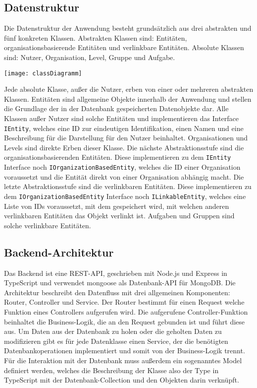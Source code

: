 \subsection{Datenstruktur}
Die Datenstruktur der Anwendung besteht grundsätzlich aus drei abstrakten und fünf konkreten Klassen. Abstrakten Klassen sind: Entitäten, organisationsbasierende Entitäten und verlinkbare Entitäten. Absolute Klassen sind: Nutzer, Organisation, Level, Gruppe und Aufgabe.

\vspace{20pt}
\begin{center}
    \begin{minipage}{0.8\linewidth}
        \texttt{[image: classDiagramm]}
    \end{minipage}
\end{center}
\vspace{20pt}

Jede absolute Klasse, außer die Nutzer, erben von einer oder mehreren abstrakten Klassen. Entitäten sind allgemeine Objekte innerhalb der Anwendung und stellen die Grundlage der in der Datenbank gespeicherten Datenobjekte dar. Alle Klassen außer Nutzer sind solche Entitäten und implementieren das Interface \verb|IEntity|, welches eine ID zur eindeutigen Identifikation, einen Namen und eine Beschreibung für die Darstellung für den Nutzer beinhaltet. Organisationen und Levels sind direkte Erben dieser Klasse. Die nächste Abstraktionsstufe sind die organisationsbasierenden Entitäten. Diese implementieren zu dem \verb|IEntity| Interface noch \verb|IOrganizationBasedEntity|, welches die ID einer Organisation voraussetzt und die Entität direkt von einer Organisation abhängig macht. Die letzte Abstraktionsstufe sind die verlinkbaren Entitäten. Diese implementieren zu dem \verb|IOrganizationBasedEntity| Interface noch \verb|ILinkableEntity|, welches eine Liste von IDs voraussetzt, mit dem gespeichert wird, mit welchen anderen verlinkbaren Entitäten das Objekt verlinkt ist. Aufgaben und Gruppen sind solche verlinkbare Entitäten.

\subsection{Backend-Architektur}
Das Backend ist eine REST-API, geschrieben mit Node.js und Express in TypeScript und verwendet mongoose als Datenbank-API für MongoDB. Die Architektur beschreibt den Datenfluss mit drei allgemeinen Komponenten: Router, Controller und Service.
Der Router bestimmt für einen Request welche Funktion eines Controllers aufgerufen wird. Die aufgerufene Controller-Funktion beinhaltet die Business-Logik, die an den Request gebunden ist und führt diese aus. Um Daten aus der Datenbank zu holen oder die geholten Daten zu modifizieren gibt es für jede Datenklasse einen Service, der die benötigten Datenbankoperationen implementiert und somit von der Business-Logik trennt. Für die Interaktion mit der Datenbank muss außerdem ein sogenanntes Model definiert werden, welches die Beschreibung der Klasse also der Type in TypeScript mit der Datenbank-Collection und den Objekten darin verknüpft.

